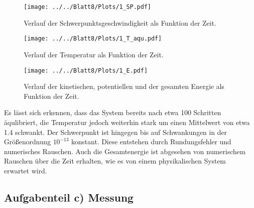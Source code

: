 \begin{figure}[H]
\texttt{[image: ../../Blatt8/Plots/1\_SP.pdf]}
\caption{Verlauf der Schwerpunktsgeschwindigkeit als Funktion der Zeit.}
\label{fig:SP}
\end{figure}
\begin{figure}[H]
\texttt{[image: ../../Blatt8/Plots/1\_T\_aqu.pdf]}
\caption{Verlauf der Temperatur als Funktion der Zeit.}
\label{fig:T1}
\end{figure}
\begin{figure}[H]
\texttt{[image: ../../Blatt8/Plots/1\_E.pdf]}
\caption{Verlauf der kinetischen, potentiellen und der gesamten Energie als Funktion der Zeit.}
\label{fig:E1}
\end{figure}

Es lässt sich erkennen, dass das System bereits nach etwa 100 Schritten äqulibriert, die Temperatur jedoch weiterhin stark um einen Mittelwert von etwa 1.4 schwankt.
Der Schwerpunkt ist hingegen bis auf Schwankungen in der Größenordnung $10^{-13}$ konstant. Diese entstehen durch Rundungsfehler und numerisches Rauschen.
Auch die Gesamtenergie ist abgesehen von numerischem Rauschen über die Zeit erhalten, wie es von einem physikalischen System erwartet wird.



\subsection*{Aufgabenteil c) Messung}

